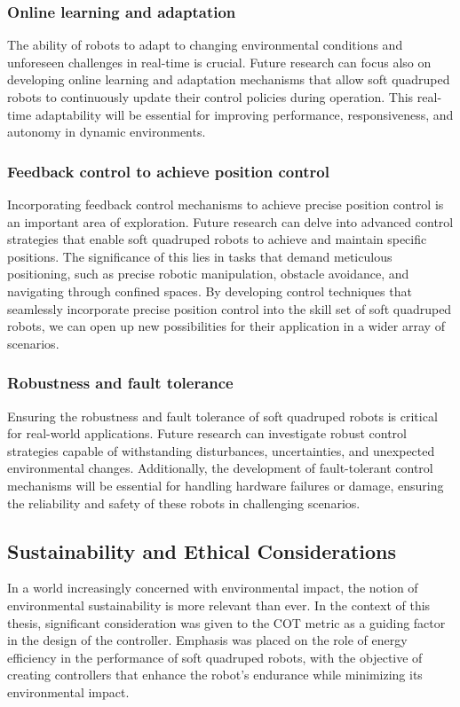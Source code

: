 \subsubsection*{Online learning and adaptation}
The ability of robots to adapt to changing environmental conditions and unforeseen challenges in real-time is crucial. Future research can focus also on developing online learning and adaptation mechanisms that allow soft quadruped robots to continuously update their control policies during operation. This real-time adaptability will be essential for improving performance, responsiveness, and autonomy in dynamic environments.

\subsubsection*{Feedback control to achieve position control}
Incorporating feedback control mechanisms to achieve precise position control is an important area of exploration. Future research can delve into advanced control strategies that enable soft quadruped robots to achieve and maintain specific positions. The significance of this lies in tasks that demand meticulous positioning, such as precise robotic manipulation, obstacle avoidance, and navigating through confined spaces. By developing control techniques that seamlessly incorporate precise position control into the skill set of soft quadruped robots, we can open up new possibilities for their application in a wider array of scenarios.

\subsubsection*{Robustness and fault tolerance}
Ensuring the robustness and fault tolerance of soft quadruped robots is critical for real-world applications. Future research can investigate robust control strategies capable of withstanding disturbances, uncertainties, and unexpected environmental changes. Additionally, the development of fault-tolerant control mechanisms will be essential for handling hardware failures or damage, ensuring the reliability and safety of these robots in challenging scenarios.

\subsection{Sustainability and Ethical Considerations}
In a world increasingly concerned with environmental impact, the notion of environmental sustainability is more relevant than ever. In the context of this thesis, significant consideration was given to the COT metric as a guiding factor in the design of the controller. Emphasis was placed on the role of energy efficiency in the performance of soft quadruped robots, with the objective of creating controllers that enhance the robot's endurance while minimizing its environmental impact.

